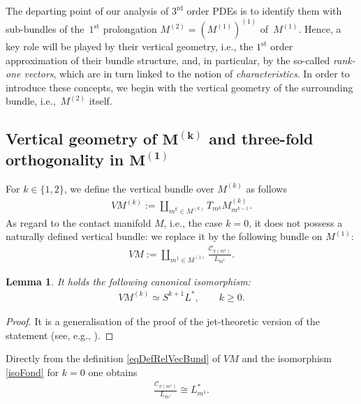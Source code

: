 \documentclass[10pt,a4paper]{amsart}
\newcommand{\C}{\mathcal{C}}
\newcommand{\St}{^\textrm{st}}
\newcommand{\Rd}{^\textrm{rd}}
\numberwithin{equation}{section}
\newtheorem{Lemma}[Theorem]{Lemma}
\begin{document}
The departing point of our analysis of $3\Rd$ order PDEs is to identify them with sub-bundles of the~$1\St$ prolongation $M^{(2)}=(M^{(1)})^{(1)}$ of~$M^{(1)}$. Hence, a key role will be played by their vertical geometry, i.e., the $1\St$ order approximation of their bundle structure, and, in particular, by the so-called \emph{rank-one vectors}, which are in turn linked to the notion of \emph{characteristics}. In order to introduce these concepts, we begin with the vertical geometry of the surrounding bundle, i.e.,~$M^{(2)}$ itself.

\subsection[Vertical geometry of $M^{(k)}$ and three-fold orthogonality in $M^{(1)}$]{Vertical geometry of $\boldsymbol{M^{(k)}}$ and three-fold orthogonality in $\boldsymbol{M^{(1)}}$}

 For $k\in\{1,2\}$,
we def\/ine the vertical bundle over $M^{(k)}$ as follows
\begin{gather*}
VM^{(k)}:=\coprod_{m^k\in M^{(k)}}T_{m^k}M^{(k)}_{m^{k-1}}.
\end{gather*}
As regard to the contact manifold $M$, i.e., the case $k=0$, it does not possess a naturally def\/ined vertical bundle: we replace it by the following bundle on $M^{(1)}$:
\begin{gather}\label{eqDefRelVecBund}
VM:=\coprod_{m^1\in M^{(1)}}\frac{\C_{\pi (m^1)}}{L_{m^1}}.
\end{gather}

\begin{Lemma}\label{lemFund}
It holds the following canonical isomorphism:
 \begin{gather}\label{isoFond}
VM^{(k)}\simeq S^{k+1}L^*, \qquad k\geq 0.
\end{gather}
\end{Lemma}
\begin{proof}
It is a generalisation of the proof of the jet-theoretic version of the statement (see, e.g., \cite[Theo\-rem~3.2]{ThesisMichi}).
\end{proof}

Directly from the def\/inition \eqref{eqDefRelVecBund} of $VM$ and the isomorphism \eqref{isoFond} for $k=0$ one obtains
\begin{gather}\label{eq1ellstar}
 \frac{\C_{\pi (m^1)}}{L_{m^1}}\cong L_{m^1}^\ast.
\end{gather}
\end{document}
